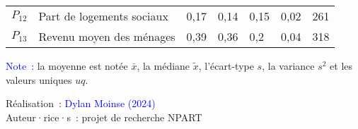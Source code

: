 \begin{table}[h!]
{\begin{tabular}{p{}p{}p{}p{}p{}p{}p{}}
\small{\(P_{12}\)} & \small{Part de logements sociaux} & \small{0,17} & \small{0,14} & \small{0,15} & \small{0,02} & \small{261}\\
\small{\(P_{13}\)} & \small{Revenu moyen des ménages} & \small{0,39} & \small{0,36} & \small{0,2} & \small{0,04} & \small{318}\\
        \hline
    \end{tabular}}
    \caption*{}
    \vspace{5pt}
        \begin{flushleft}\scriptsize{
        \textcolor{blue}{Note~:} la moyenne est notée \(\bar{x}\), la médiane \(\tilde{x}\), l'écart-type \(s\), la variance \(s^2\) et les valeurs uniques \(uq\).
        }\end{flushleft}
        \begin{flushright}\scriptsize
        Réalisation~: \textcolor{blue}{Dylan Moinse (2024)}
        \\
        Auteur·rice·s~: projet de recherche \acrshort{NPART}
        \end{flushright}
        \end{table}